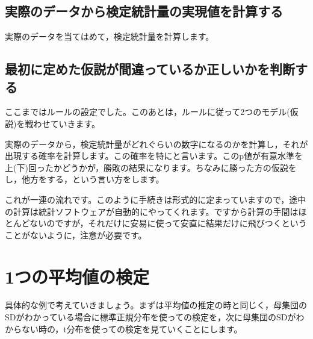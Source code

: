 \documentclass{ltjsbook}
\begin{document}
\subsection{実際のデータから検定統計量の実現値を計算する}

実際のデータを当てはめて，検定統計量を計算します。
\subsection{最初に定めた仮説が間違っているか正しいかを判断する}
ここまではルールの設定でした。このあとは，ルールに従って2つのモデル(仮説)を戦わせていきます。

実際のデータから，検定統計量がどれぐらいの数字になるのかを計算し，それが出現する確率を計算します。この確率を特にと言います。このp値が有意水準を上(下)回ったかどうかが，勝敗の結果になります。ちなみに勝った方の仮説をし，他方をする，という言い方をします。

これが一連の流れです。このように手続きは形式的に定まっていますので，途中の計算は統計ソフトウェアが自動的にやってくれます。ですから計算の手間はほとんどないのですが，それだけに安易に使って安直に結果だけに飛びつくということがないように，注意が必要です。



\section{1つの平均値の検定}
具体的な例で考えていきましょう。まずは平均値の推定の時と同じく，母集団のSDがわかっている場合に標準正規分布を使っての検定を，次に母集団のSDがわからない時の，t分布を使っての検定を見ていくことにします。
\end{document}
